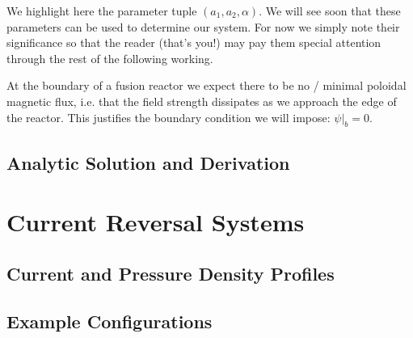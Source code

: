 \begin{remark}
    We highlight here the parameter tuple $(a_1, a_2, \alpha)$. We will see soon that 
    these parameters can be used to determine our system. For now we simply note their 
    significance so that the reader (that's you!) may pay them special attention through the rest of the following working.
\end{remark}

At the boundary of a fusion reactor we expect there to be no / minimal poloidal magnetic 
flux, i.e. that the field strength dissipates as we approach the edge of the reactor. This justifies 
the boundary condition we will impose: $\psi |_b = 0$. 


\subsection{Analytic Solution and Derivation}

\section{Current Reversal Systems}

\subsection{Current and Pressure Density Profiles}

\subsection{Example Configurations}
